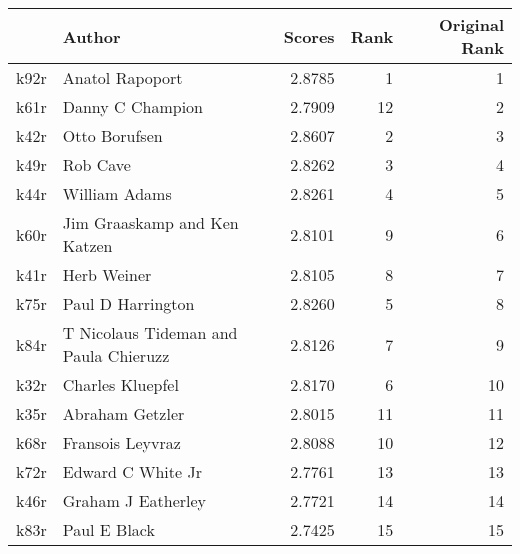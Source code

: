 \begin{tabular}{llrrr}
\toprule
{} &                                 Author &  Scores &  Rank &  Original Rank \\
\midrule
k92r &                        Anatol Rapoport &  2.8785 &     1 &              1 \\
k61r &                       Danny C Champion &  2.7909 &    12 &              2 \\
k42r &                          Otto Borufsen &  2.8607 &     2 &              3 \\
k49r &                               Rob Cave &  2.8262 &     3 &              4 \\
k44r &                          William Adams &  2.8261 &     4 &              5 \\
k60r &           Jim Graaskamp and Ken Katzen &  2.8101 &     9 &              6 \\
k41r &                            Herb Weiner &  2.8105 &     8 &              7 \\
k75r &                      Paul D Harrington &  2.8260 &     5 &              8 \\
k84r &  T Nicolaus Tideman and Paula Chieruzz &  2.8126 &     7 &              9 \\
k32r &                       Charles Kluepfel &  2.8170 &     6 &             10 \\
k35r &                        Abraham Getzler &  2.8015 &    11 &             11 \\
k68r &                       Fransois Leyvraz &  2.8088 &    10 &             12 \\
k72r &                      Edward C White Jr &  2.7761 &    13 &             13 \\
k46r &                     Graham J Eatherley &  2.7721 &    14 &             14 \\
k83r &                           Paul E Black &  2.7425 &    15 &             15 \\
\bottomrule
\end{tabular}

